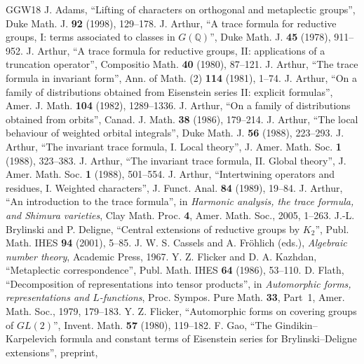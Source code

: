 \documentclass[12pt,letterpaper,openany]{book}
\numberwithin{equation}{chapter}
\theoremstyle{plain}
\theoremstyle{definition}
\theoremstyle{remark}
\theoremstyle{plain}
\begin{document}
\begin{thebibliography}{GGW18}
 J. Adams, ``Lifting of characters on orthogonal and
metaplectic groups'', Duke Math. J. \textbf{92} (1998), 129--178.
 J. Arthur, ``A trace formula for reductive groups, I: terms
associated to classes in $G(\mathbb{Q})$'', Duke Math. J. \textbf{45} (1978), 911--952.
 J. Arthur, ``A trace formula for reductive groups, II:
applications of a truncation operator'', Compositio Math. \textbf{40}
(1980), 87--121.
 J. Arthur, ``The trace formula in invariant form'', Ann.
of Math. (2) \textbf{114} (1981), 1--74.
 J. Arthur, ``On a family of distributions obtained from
Eisenstein series II: explicit formulas'', Amer. J. Math. \textbf{104}
(1982), 1289--1336.
 J. Arthur, ``On a family of distributions obtained from
orbits'', Canad. J. Math. \textbf{38} (1986), 179--214.
 J. Arthur, ``The local behaviour of weighted orbital
integrals'', Duke Math. J. \textbf{56} (1988), 223--293.
 J. Arthur, ``The invariant trace formula, I. Local theory'',
J. Amer. Math. Soc. \textbf{1} (1988), 323--383.
 J. Arthur, ``The invariant trace formula, II. Global
theory'', J. Amer. Math. Soc. \textbf{1} (1988), 501--554.
 J. Arthur, ``Intertwining operators and residues, I.
Weighted characters'', J. Funct. Anal. \textbf{84} (1989), 19--84.
 J. Arthur, ``An introduction to the trace formula'', in
\emph{Harmonic analysis, the trace formula, and Shimura varieties}, Clay
Math. Proc. \textbf{4}, Amer. Math. Soc., 2005, 1--263.
 J.-L. Brylinski and P. Deligne, ``Central extensions of
reductive groups by $K_2$'', Publ. Math. IHES \textbf{94} (2001), 5--85.
 J. W. S. Cassels and A. Fr\"ohlich (eds.), \emph{Algebraic
number theory}, Academic Press, 1967.
 Y. Z. Flicker and D. A. Kazhdan, ``Metaplectic
correspondence'', Publ. Math. IHES \textbf{64} (1986), 53--110.
 D. Flath, ``Decomposition of representations into tensor
products'', in \emph{Automorphic forms, representations and
$L$-functions}, Proc. Sympos. Pure Math. \textbf{33}, Part~1, Amer. Math.
Soc., 1979, 179--183.
 Y. Z. Flicker, ``Automorphic forms on covering groups of
$GL(2)$'', Invent. Math. \textbf{57} (1980), 119--182.
 F. Gao, ``The Gindikin--Karpelevich formula and constant
terms of Eisenstein series for Brylinski--Deligne extensions'', preprint,

\end{thebibliography}
\end{document}

